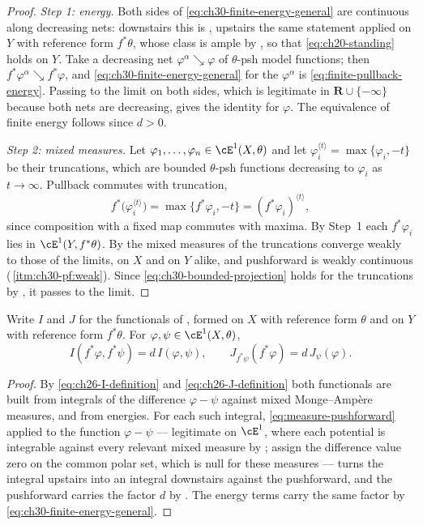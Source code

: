 \begin{proof}
\emph{Step 1: energy.}  Both sides of
\eqref{eq:ch30-finite-energy-general} are continuous along decreasing nets:
downstairs this is , upstairs the same
statement applied on $Y$ with reference form $f^*\theta$, whose class is
ample by , so that
\eqref{eq:ch20-standing} holds on $Y$.  Take a decreasing net
$\varphi^\alpha\searrow\varphi$ of $\theta$-psh model functions; then
$f^*\varphi^\alpha\searrow f^*\varphi$, and
\eqref{eq:ch30-finite-energy-general} for the $\varphi^\alpha$ is
\eqref{eq:finite-pullback-energy}.  Passing to the limit on both sides,
which is legitimate in $\mathbf R\cup\{-\infty\}$ because both nets are
decreasing, gives the identity for $\varphi$.  The equivalence of finite
energy follows since $d>0$.

\emph{Step 2: mixed measures.}  Let
$\varphi_1,\ldots,\varphi_n\in\cE^1(X,\theta)$ and let
$\varphi_i^{\langle t\rangle}=\max\{\varphi_i,-t\}$ be their truncations,
which are bounded $\theta$-psh functions decreasing to $\varphi_i$ as
$t\to\infty$.  Pullback commutes with truncation,
\[
 f^*\bigl(\varphi_i^{\langle t\rangle}\bigr)
 =\max\{f^*\varphi_i,-t\}
 =(f^*\varphi_i)^{\langle t\rangle},
\]
since composition with a fixed map commutes with maxima.  By Step~1 each
$f^*\varphi_i$ lies in $\cE^1(Y,f^*\theta)$.  By
 the mixed measures of the truncations converge
weakly to those of the limits, on $X$ and on $Y$ alike, and pushforward
is weakly continuous
(\,\cref{itm:ch30-pf:weak}).  Since
\eqref{eq:ch30-bounded-projection} holds for the truncations by
, it passes to the limit.
\end{proof}

\begin{corollary}
\label{cor:ch30-finite-IJ}
Write $I$ and $J$ for the functionals of , formed on
$X$ with reference form $\theta$ and on $Y$ with reference form
$f^*\theta$.  For $\varphi,\psi\in\cE^1(X,\theta)$,
\begin{equation}
\label{eq:ch30-finite-IJ}
 I(f^*\varphi,f^*\psi)=d\,I(\varphi,\psi),
 \qquad
 J_{f^*\psi}(f^*\varphi)=d\,J_\psi(\varphi).
\end{equation}
\end{corollary}

\begin{proof}
By \eqref{eq:ch26-I-definition} and \eqref{eq:ch26-J-definition} both
functionals are built from integrals of the difference $\varphi-\psi$
against mixed Monge--Amp\`ere measures, and from energies.  For each such
integral, \eqref{eq:measure-pushforward} applied to the function
$\varphi-\psi$ --- legitimate on $\cE^1$, where each potential is
integrable against every relevant mixed measure by
; assign the difference value zero on the
common polar set, which is null for these measures ---
turns the integral upstairs into an integral downstairs against the
pushforward, and the pushforward carries the factor $d$ by
.  The energy terms carry the same
factor by \eqref{eq:ch30-finite-energy-general}.
\end{proof}

